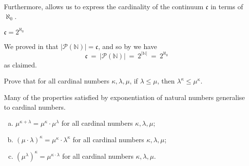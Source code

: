 Furthermore,  allows us to express the cardinality of the continuum $\mathfrak{c}$ in terms of $\aleph_0$.

\begin{corollary}
$\mathfrak{c} = 2^{\aleph_0}$
\end{corollary}

\begin{cproof}
We proved in  that $|\mathcal{P}(\mathbb{N})| = \mathfrak{c}$, and so by  we have
\[ \mathfrak{c} ~=~ |\mathcal{P}(\mathbb{N})| ~=~ 2^{|\mathbb{N}|} ~=~ 2^{\aleph_0} \]
as claimed.
\end{cproof}

\begin{exercise}
\label{exCardinalExponentiationIsMonotone}
Prove that for all cardinal numbers $\kappa, \lambda, \mu$, if $\lambda \le \mu$, then $\lambda^{\kappa} \le \mu^{\kappa}$.
\end{exercise}

Many of the properties satisfied by exponentiation of natural numbers generalise to cardinal numbers.

\begin{theorem}
\label{thmPropertiesOfCardinalExponentiation}
\fixlistskip
\begin{enumerate}[(a)]
\item $\mu^{\kappa + \lambda} = \mu^{\kappa} \cdot \mu^{\lambda}$ for all cardinal numbers $\kappa, \lambda, \mu$;
\item $(\mu \cdot \lambda)^{\kappa} = \mu^{\kappa} \cdot \lambda^{\kappa}$ for all cardinal numbers $\kappa, \lambda, \mu$;
\item $(\mu^{\lambda})^{\kappa} = \mu^{\kappa \cdot \lambda}$ for all cardinal numbers $\kappa, \lambda, \mu$.
\end{enumerate}
\end{theorem}

